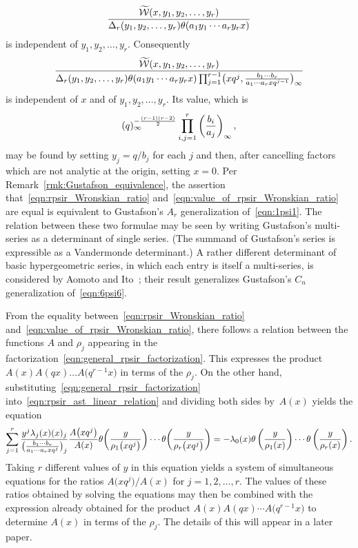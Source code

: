 \documentclass[pdftex]{sigma}
\numberwithin{equation}{section}
\begin{document}
\[ {\widetilde{\mathcal{W}}(x,y_1,y_2,\dots,y_r) \over \Delta_r(y_1,y_2,\dots,y_r) \theta(a_1y_1\cdots a_ry_r x)} \]
is independent of $y_1,y_2,\dots,y_r$. Consequently
\begin{equation} \label{eqn:rpsir_Wronskian_ratio}
{\widetilde{\mathcal{W}}(x,y_1,y_2,\dots,y_r) \over \Delta_r(y_1,y_2,\dots,y_r) \theta(a_1y_1\cdots a_ry_r x)\prod_{j=1}^{r-1} \bigl(xq^j,{b_1\cdots b_r \over a_1\cdots a_r x q^{j-1}}\bigr)_\infty}
\end{equation}
is independent of $x$ and of $y_1,y_2,\dots,y_r$. Its value, which is
\begin{equation} \label{eqn:value_of_rpsir_Wronskian_ratio}
(q)_\infty^{-{(r-1)(r-2) \over 2}} \prod_{i,j=1}^r \left({b_i \over a_j}\right)_{ \infty},
\end{equation}
may be found by setting $y_j = q/b_j$ for each $j$ and then, after cancelling factors which are not analytic at the origin, setting $x=0$. Per Remark~\ref{rmk:Gustafson_equivalence}, the assertion that~\eqref{eqn:rpsir_Wronskian_ratio} and~\eqref{eqn:value_of_rpsir_Wronskian_ratio} are equal is equivalent to Gustafson's $A_r$ generalization of~\eqref{eqn:1psi1}. The relation between these two formulae may be seen by writing Gustafson's multi-series as a determinant of single series. (The summand of Gustafson's series is expressible as a Vandermonde determinant.) A rather different determinant of basic hypergeometric series, in which each entry is itself a multi-series, is considered by Aomoto and Ito~\cite[Theorem~3.9]{Aomoto2008}; their result generalizes Gustafson's $C_n$ generalization of~\eqref{eqn:6psi6}.

From the equality between~\eqref{eqn:rpsir_Wronskian_ratio} and~\eqref{eqn:value_of_rpsir_Wronskian_ratio}, there follows a relation between the functions $A$ and $\rho_j$ appearing in the factorization~\eqref{eqn:general_rpsir_factorization}. This expresses the product $A(x)A(qx) \dots A\bigl(q^{r-1}x\bigr)$ in terms of the $\rho_j$. On the other hand, substituting~\eqref{eqn:general_rpsir_factorization} into~\eqref{eqn:rpsir_ast_linear_relation} and dividing both sides by~$A(x)$ yields the equation
\[ \sum_{j=1}^r {y^j \lambda_j(x) (x)_j \over \bigl({b_1\cdots b_r \over a_1\cdots a_r xq^j}\bigr)_j} {A\bigl(xq^j\bigr) \over A(x)} \theta\bigg( {y \over \rho_1\bigl(xq^j\bigr)} \bigg) \cdots \theta\bigg( {y \over \rho_r\bigl(xq^j\bigr)} \bigg) = - \lambda_0(x) \theta\left( {y \over \rho_1(x)} \right) \cdots \theta\left( {y \over \rho_r(x)} \right). \]
Taking $r$ different values of $y$ in this equation yields a system of simultaneous equations for the ratios $A\bigl(xq^j\bigr)/A(x)$ for $j=1,2,\dots,r$. The values of these ratios obtained by solving the equations may then be combined with the expression already obtained for the product $A(x)A(qx) \cdots A\bigl(q^{r-1}x\bigr)$ to determine $A(x)$ in terms of the $\rho_j$. The details of this will appear in a later paper.
\end{document}
